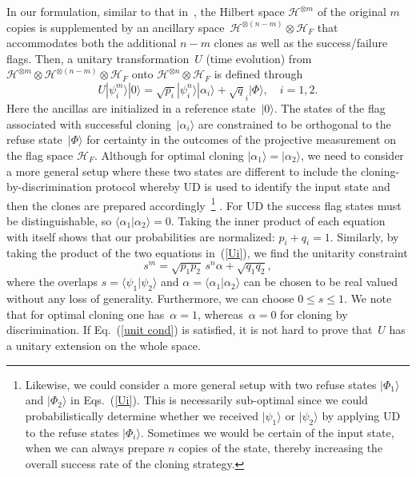 \documentclass[aps,prl,twocolumn,showpacs]{revtex4}
\newcommand{\ke}[1]{|#1\rangle}
\newcommand{\bk}[2]{\langle #1|#2\rangle}
\begin{document}
In our formulation, similar to that in~\cite{DuanGuo}, the Hilbert space ${\mathscr H}^{\otimes m}$ of the original $m$ copies is supplemented by an ancillary space~${\mathscr H}^{\otimes(n-m)}\otimes {\mathscr H}_F$ that accommodates both the additional $n-m$ clones as well as the success/failure flags. Then, a unitary transformation~$U$ (time evolution) from ${\mathscr H}^{\otimes m}\otimes {\mathscr H}^{\otimes(n-m)}\otimes {\mathscr H}_{F}$ onto ${\mathscr H}^{\otimes n}\otimes{\mathscr H}_F$ is defined through~\cite{DuanGuo}
%
\begin{equation}
U|\psi^m_i\rangle|0\rangle= \sqrt{p_i}|\psi^n_i\rangle|\alpha_i\rangle +\sqrt q_i |\Phi\rangle,\quad i=1,2. \label{Ui}
\end{equation}
%
Here the ancillas are initialized in a reference state~$\ke 0$. The states of the flag associated with successful cloning~$\ke {\alpha_i}$ are constrained to be orthogonal to the refuse state~$\ke {\Phi}$ for certainty in the outcomes of the projective measurement on the flag space ${\mathscr H}_F$.  Although for optimal cloning $|\alpha_1\rangle=|\alpha_2\rangle$, we need to consider a more general setup where these two states are different  
to include  the cloning-by-discrimination
protocol whereby UD is used to identify the input state and then the clones are prepared accordingly~\footnote{%
%
Likewise, we could consider a more general setup with two refuse states $|\Phi_1\rangle$ and $|\Phi_2\rangle$ in Eqs.~(\ref{Ui}). This is necessarily sub-optimal since we could probabilistically determine whether we received $\ke{\psi_1}$ or $\ke{\psi_2}$ by applying UD to the refuse states $\ke {\Phi_i}$.  Sometimes we would be  certain of the input state, when we can always prepare $n$ copies of the state,  thereby increasing the overall success rate of the cloning strategy.
%
}%
.
For UD the success flag states must be distinguishable, so $\langle\alpha_1|\alpha_2\rangle=0$.
Taking the inner product of each equation with itself shows that our probabilities are normalized: $p_i+q_i=1$.
Similarly, by taking the product of the two equations in~(\ref{Ui}), we find the unitarity constraint 
%
\begin{equation}
s^m=\sqrt{p_1 p_2}\, s^n \alpha+\sqrt{q_1 q_2},
\label{unit cond}
\end{equation}
%
where the overlaps
$s = \bk {\psi_1}{\psi_2}$ and $\alpha=\langle\alpha_1|\alpha_2\rangle$ can be chosen to be real valued without any loss of generality. Furthermore, we can choose $0\le s\le 1$.  We note that for optimal cloning one has~$\alpha=1$, whereas~$\alpha=0$ for cloning by discrimination. If Eq.~(\ref{unit cond}) is satisfied, it is not hard to prove that~$U$ has a unitary extension on the whole space. %
\end{document}
